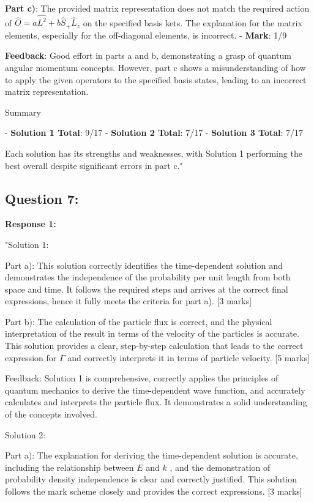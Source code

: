 \documentclass[a4paper,11pt]{article}
\begin{document}
\textbf{Part c)}: The provided matrix representation does not match the required action of \( \hat{O} = a\hat{L^2} + b\hat{S}_{+}\hat{L}_{z} \) on the specified basis kets. The explanation for the matrix elements, especially for the off-diagonal elements, is incorrect.
- \textbf{Mark}: 1/9

\textbf{Feedback}: Good effort in parts a and b, demonstrating a grasp of quantum angular momentum concepts. However, part c shows a misunderstanding of how to apply the given operators to the specified basis states, leading to an incorrect matrix representation.

Summary

- \textbf{Solution 1 Total}: 9/17
- \textbf{Solution 2 Total}: 7/17
- \textbf{Solution 3 Total}: 7/17

Each solution has its strengths and weaknesses, with Solution 1 performing the best overall despite significant errors in part c."

\subsection*{Question 7:}

\textbf{Response 1:}

"Solution 1:

Part a): This solution correctly identifies the time-dependent solution and demonstrates the independence of the probability per unit length from both space and time. It follows the required steps and arrives at the correct final expressions, hence it fully meets the criteria for part a). [3 marks]

Part b): The calculation of the particle flux is correct, and the physical interpretation of the result in terms of the velocity of the particles is accurate. This solution provides a clear, step-by-step calculation that leads to the correct expression for \( \Gamma \) and correctly interprets it in terms of particle velocity. [5 marks]

Feedback: Solution 1 is comprehensive, correctly applies the principles of quantum mechanics to derive the time-dependent wave function, and accurately calculates and interprets the particle flux. It demonstrates a solid understanding of the concepts involved.

Solution 2:

Part a): The explanation for deriving the time-dependent solution is accurate, including the relationship between \( E \) and \(k\) , and the demonstration of probability density independence is clear and correctly justified. This solution follows the mark scheme closely and provides the correct expressions. [3 marks]
\end{document}
